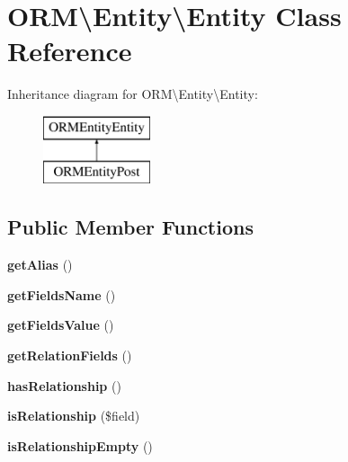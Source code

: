 \hypertarget{classORM_1_1Entity_1_1Entity}{}\section{O\+RM\textbackslash{}Entity\textbackslash{}Entity Class Reference}
\label{classORM_1_1Entity_1_1Entity}
Inheritance diagram for O\+RM\textbackslash{}Entity\textbackslash{}Entity\+:\begin{figure}[H]
\begin{center}
\leavevmode
\includegraphics[height=2.000000cm]{classORM_1_1Entity_1_1Entity}
\end{center}
\end{figure}
\subsection*{Public Member Functions}
\begin{DoxyCompactItemize}
\item 
{\bfseries get\+Alias} ()\hypertarget{classORM_1_1Entity_1_1Entity_a6d8eb5967b0478ef2e3d96e7ea940b14}{}\label{classORM_1_1Entity_1_1Entity_a6d8eb5967b0478ef2e3d96e7ea940b14}

\item 
{\bfseries get\+Fields\+Name} ()\hypertarget{classORM_1_1Entity_1_1Entity_ad701973aa9e5faa28e7bc10916405a2b}{}\label{classORM_1_1Entity_1_1Entity_ad701973aa9e5faa28e7bc10916405a2b}

\item 
{\bfseries get\+Fields\+Value} ()\hypertarget{classORM_1_1Entity_1_1Entity_a71eed8c12a7d78c03b4cd0d4d6f60cc5}{}\label{classORM_1_1Entity_1_1Entity_a71eed8c12a7d78c03b4cd0d4d6f60cc5}

\item 
{\bfseries get\+Relation\+Fields} ()\hypertarget{classORM_1_1Entity_1_1Entity_a6391931d6ea29de3080cd262e3b28b9d}{}\label{classORM_1_1Entity_1_1Entity_a6391931d6ea29de3080cd262e3b28b9d}

\item 
{\bfseries has\+Relationship} ()\hypertarget{classORM_1_1Entity_1_1Entity_a7b5e2a8499ab15d609dc3444546f9237}{}\label{classORM_1_1Entity_1_1Entity_a7b5e2a8499ab15d609dc3444546f9237}

\item 
{\bfseries is\+Relationship} (\$field)\hypertarget{classORM_1_1Entity_1_1Entity_ad8388dee9e958896aad552379e495588}{}\label{classORM_1_1Entity_1_1Entity_ad8388dee9e958896aad552379e495588}

\item 
{\bfseries is\+Relationship\+Empty} ()\hypertarget{classORM_1_1Entity_1_1Entity_a2fe2a73ce4726f812fd0e93a8b59020e}{}\label{classORM_1_1Entity_1_1Entity_a2fe2a73ce4726f812fd0e93a8b59020e}

\end{DoxyCompactItemize}
